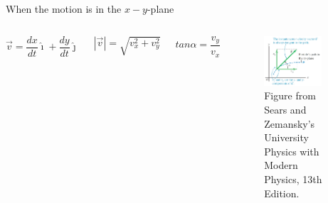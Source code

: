 \documentclass[]{beamer}
\begin{document}
\begin{frame}
When the motion is in the $x-y$-plane

    \vspace{3mm}



 
    \begin{columns}[c]
        \column{2in}  %
       




         \begin{equation}
          \vec{v}=\frac{dx}{dt}\hat{\imath}+\frac{dy}{dt}\hat{\jmath}
         \end{equation}



        \vspace{3mm}



         \begin{equation}
          |\vec{v}|=\sqrt{v^2_x+v^2_y}
         \end{equation}



        \vspace{3mm}

         \begin{equation}
        tan \alpha=\frac{v_y}{v_x}
         \end{equation}



        \column{2.5in}
        
        \begin{figure}[h!]  
       \includegraphics[width=0.8\textwidth]{images/10.jpg}
        \caption{ {\tiny Figure from Sears and Zemansky's University Physics 
        with Modern Physics, 13th Edition.} }
     \end{figure}
     
     
     
        \end{columns}



\end{frame}
\end{document}
